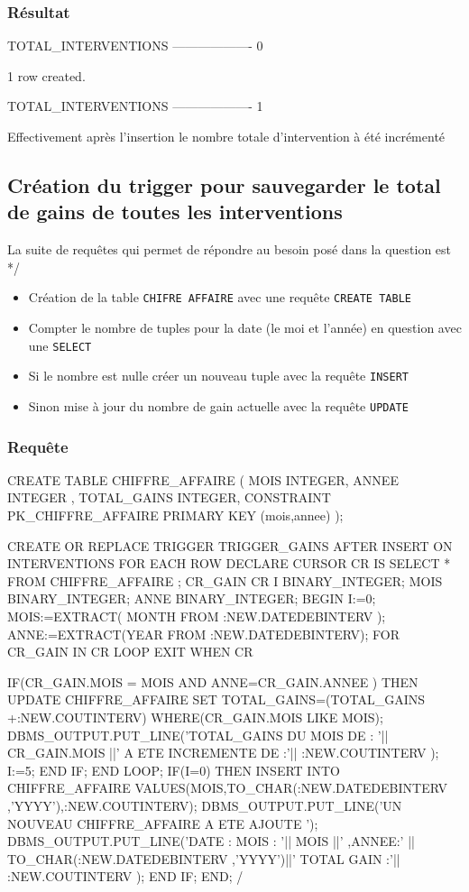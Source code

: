 \documentclass[•]{article}
\begin{document}
\subsubsection{Résultat}
\begin{sql}
TOTAL_INTERVENTIONS
-------------------
                  0

1 row created.

TOTAL_INTERVENTIONS
-------------------
                  1
\end{sql}

Effectivement après l'insertion le nombre totale d'intervention à été incrémenté

\subsection{Création du trigger pour sauvegarder le total de gains de
toutes les interventions}

La suite de requêtes qui permet de répondre au besoin posé dans la question est */

\begin{itemize}
\item Création de la table \texttt{CHIFRE\ AFFAIRE} avec une requête \texttt{CREATE\ TABLE} 
\item Compter le nombre de tuples pour la date (le moi et l'année) en question avec une  \texttt{SELECT}
\item Si le nombre est nulle créer un nouveau tuple avec la requête \texttt{INSERT}
\item Sinon mise à jour du nombre de gain actuelle avec la requête \texttt{UPDATE}
\end{itemize}


\subsubsection{Requête}
\begin{sql}
CREATE TABLE CHIFFRE_AFFAIRE
(
	 MOIS INTEGER, 
	 ANNEE INTEGER ,
	 TOTAL_GAINS INTEGER,
CONSTRAINT PK_CHIFFRE_AFFAIRE PRIMARY KEY (mois,annee)
);

CREATE OR REPLACE TRIGGER TRIGGER_GAINS 
AFTER INSERT  ON INTERVENTIONS 
FOR EACH ROW
DECLARE 
CURSOR CR IS SELECT * FROM CHIFFRE_AFFAIRE ;
CR_GAIN CR%
I BINARY_INTEGER;
MOIS BINARY_INTEGER;
ANNE BINARY_INTEGER;
BEGIN
I:=0;
MOIS:=EXTRACT( MONTH FROM :NEW.DATEDEBINTERV );
ANNE:=EXTRACT(YEAR FROM :NEW.DATEDEBINTERV);
  FOR CR_GAIN IN CR LOOP
  EXIT WHEN  CR%
  
  IF(CR_GAIN.MOIS = MOIS AND ANNE=CR_GAIN.ANNEE ) THEN
  UPDATE CHIFFRE_AFFAIRE SET TOTAL_GAINS=(TOTAL_GAINS +:NEW.COUTINTERV)  WHERE(CR_GAIN.MOIS LIKE MOIS);
  DBMS_OUTPUT.PUT_LINE('TOTAL_GAINS DU MOIS DE : '|| CR_GAIN.MOIS ||' A ETE INCREMENTE DE :'|| :NEW.COUTINTERV ); I:=5;
  END IF;
  END LOOP;
  IF(I=0) THEN
  INSERT INTO CHIFFRE_AFFAIRE VALUES(MOIS,TO_CHAR(:NEW.DATEDEBINTERV ,'YYYY'),:NEW.COUTINTERV);
  DBMS_OUTPUT.PUT_LINE('UN NOUVEAU CHIFFRE_AFFAIRE A ETE AJOUTE ');
  DBMS_OUTPUT.PUT_LINE('DATE : MOIS : '|| MOIS ||' ,ANNEE:' || TO_CHAR(:NEW.DATEDEBINTERV ,'YYYY')||' TOTAL GAIN :'|| :NEW.COUTINTERV );
END IF;
END;
/
\end{sql}
\end{document}
